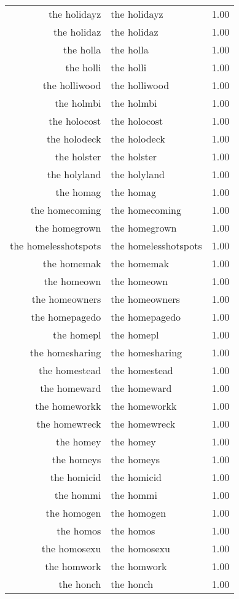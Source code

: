 \begin{table}[ht]
\begin{tabular}{rlr}
  the holidayz & the holidayz & 1.00 \\ 
  the holidaz & the holidaz & 1.00 \\ 
  the holla & the holla & 1.00 \\ 
  the holli & the holli & 1.00 \\ 
  the holliwood & the holliwood & 1.00 \\ 
  the holmbi & the holmbi & 1.00 \\ 
  the holocost & the holocost & 1.00 \\ 
  the holodeck & the holodeck & 1.00 \\ 
  the holster & the holster & 1.00 \\ 
  the holyland & the holyland & 1.00 \\ 
  the homag & the homag & 1.00 \\ 
  the homecoming & the homecoming & 1.00 \\ 
  the homegrown & the homegrown & 1.00 \\ 
  the homelesshotspots & the homelesshotspots & 1.00 \\ 
  the homemak & the homemak & 1.00 \\ 
  the homeown & the homeown & 1.00 \\ 
  the homeowners & the homeowners & 1.00 \\ 
  the homepagedo & the homepagedo & 1.00 \\ 
  the homepl & the homepl & 1.00 \\ 
  the homesharing & the homesharing & 1.00 \\ 
  the homestead & the homestead & 1.00 \\ 
  the homeward & the homeward & 1.00 \\ 
  the homeworkk & the homeworkk & 1.00 \\ 
  the homewreck & the homewreck & 1.00 \\ 
  the homey & the homey & 1.00 \\ 
  the homeys & the homeys & 1.00 \\ 
  the homicid & the homicid & 1.00 \\ 
  the hommi & the hommi & 1.00 \\ 
  the homogen & the homogen & 1.00 \\ 
  the homos & the homos & 1.00 \\ 
  the homosexu & the homosexu & 1.00 \\ 
  the homwork & the homwork & 1.00 \\ 
  the honch & the honch & 1.00 \\ 

\end{tabular}
\end{table}
